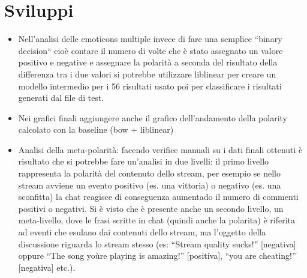 \documentclass[a4paper,12pt,openright,twoside]{report}
\theoremstyle{definition}
\begin{document}
\chapter{Sviluppi}
\label{ch:sviluppi}
\begin{itemize}
\item Nell'analisi delle emoticons multiple invece di fare una semplice ``binary decision`` cioè contare il numero di volte che è stato assegnato un valore positivo e negative e assegnare la polarità a seconda del risultato della differenza tra i due valori si potrebbe utilizzare liblinear per creare un modello intermedio per i 56 risultati usato poi per classificare i risultati generati dal file di test.
\item Nei grafici finali aggiungere anche il grafico dell'andamento della polarity calcolato con la baseline (bow + liblinear)
\item Analisi della meta-polarità: facendo verifice manuali su i dati finali ottenuti è risultato che si potrebbe fare un'analisi in due livelli: il primo livello rappresenta la polarità del contenuto dello stream, per esempio se nello stream avviene un evento positivo (es. una vittoria) o negativo (es. una sconfitta) la chat reagisce di conseguenza aumentado il numero di commenti positivi o negativi.
Si è visto che è presente anche un secondo livello, un meta-livello, dove le frasi scritte in chat (quindi anche la polarita) è riferita ad eventi che esulano dai contenuti dello stream, ma l'oggetto della discussione riguarda lo stream stesso (es: ``Stream quality sucks!'' [negativa] oppure ``The song yoùre playing is amazing!'' [positiva], ``you are cheating!'' [negativa] etc.).
\end{itemize}



\end{document}

